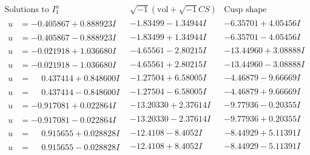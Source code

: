 \documentclass[1p]{elsarticle_modified}
\theoremstyle{definition}
\newcommand{\I}{\sqrt{-1}}
\begin{document}
$$\begin{array}{c|c|c}  
\text{Solutions to }I^u_{1}& \I (\text{vol} + \sqrt{-1}CS) & \text{Cusp shape}\\
 \hline 
\begin{aligned}
u &= -0.405867 + 0.888923 I\end{aligned}
 & -1.83499 - 1.34944 I & -6.35701 + 4.05456 I \\ \hline\begin{aligned}
u &= -0.405867 - 0.888923 I\end{aligned}
 & -1.83499 + 1.34944 I & -6.35701 - 4.05456 I \\ \hline\begin{aligned}
u &= -0.021918 + 1.036680 I\end{aligned}
 & -4.65561 - 2.80215 I & -13.44960 + 3.08888 I \\ \hline\begin{aligned}
u &= -0.021918 - 1.036680 I\end{aligned}
 & -4.65561 + 2.80215 I & -13.44960 - 3.08888 I \\ \hline\begin{aligned}
u &= \phantom{-}0.437414 + 0.848600 I\end{aligned}
 & -1.27504 + 6.58005 I & -4.46879 - 9.66669 I \\ \hline\begin{aligned}
u &= \phantom{-}0.437414 - 0.848600 I\end{aligned}
 & -1.27504 - 6.58005 I & -4.46879 + 9.66669 I \\ \hline\begin{aligned}
u &= -0.917081 + 0.022864 I\end{aligned}
 & -13.20330 + 2.37614 I & -9.77936 - 0.20355 I \\ \hline\begin{aligned}
u &= -0.917081 - 0.022864 I\end{aligned}
 & -13.20330 - 2.37614 I & -9.77936 + 0.20355 I \\ \hline\begin{aligned}
u &= \phantom{-}0.915655 + 0.028828 I\end{aligned}
 & -12.4108 - 8.4052 I & -8.44929 + 5.11391 I \\ \hline\begin{aligned}
u &= \phantom{-}0.915655 - 0.028828 I\end{aligned}
 & -12.4108 + 8.4052 I & -8.44929 - 5.11391 I \\ \hline\begin{aligned}

\end{aligned}
\end{array}$$
\end{document}
